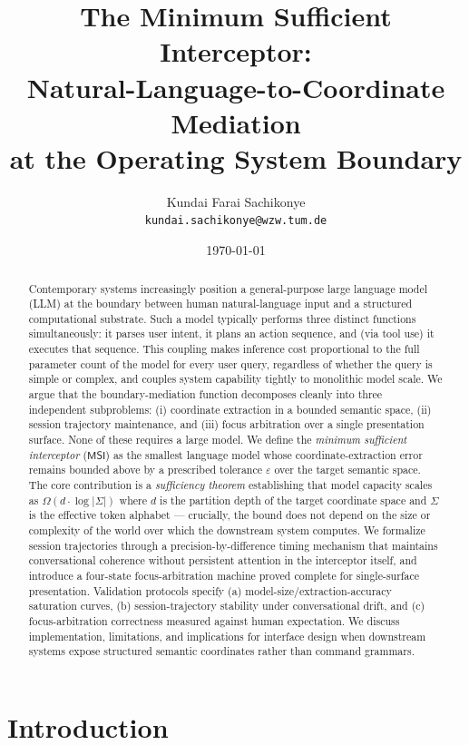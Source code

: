 \documentclass[11pt,a4paper]{article}
\title{The Minimum Sufficient Interceptor:\\
Natural-Language-to-Coordinate Mediation\\
at the Operating System Boundary}
\author{Kundai Farai Sachikonye\\
\texttt{kundai.sachikonye@wzw.tum.de}}
\date{\today}
\theoremstyle{definition}
\theoremstyle{remark}
\newcommand{\MSI}{\mathsf{MSI}}
\begin{document}
\maketitle

\begin{abstract}
Contemporary systems increasingly position a general-purpose large language model (LLM) at the boundary between human natural-language input and a structured computational substrate. Such a model typically performs three distinct functions simultaneously: it parses user intent, it plans an action sequence, and (via tool use) it executes that sequence. This coupling makes inference cost proportional to the full parameter count of the model for every user query, regardless of whether the query is simple or complex, and couples system capability tightly to monolithic model scale. We argue that the boundary-mediation function decomposes cleanly into three independent subproblems: (i) coordinate extraction in a bounded semantic space, (ii) session trajectory maintenance, and (iii) focus arbitration over a single presentation surface. None of these requires a large model. We define the \emph{minimum sufficient interceptor} ($\MSI$) as the smallest language model whose coordinate-extraction error remains bounded above by a prescribed tolerance $\varepsilon$ over the target semantic space. The core contribution is a \emph{sufficiency theorem} establishing that model capacity scales as $\Omega(d \cdot \log |\Sigma|)$ where $d$ is the partition depth of the target coordinate space and $\Sigma$ is the effective token alphabet --- crucially, the bound does not depend on the size or complexity of the world over which the downstream system computes. We formalize session trajectories through a precision-by-difference timing mechanism that maintains conversational coherence without persistent attention in the interceptor itself, and introduce a four-state focus-arbitration machine proved complete for single-surface presentation. Validation protocols specify (a) model-size/extraction-accuracy saturation curves, (b) session-trajectory stability under conversational drift, and (c) focus-arbitration correctness measured against human expectation. We discuss implementation, limitations, and implications for interface design when downstream systems expose structured semantic coordinates rather than command grammars.
\end{abstract}

\section{Introduction}
\label{sec:intro}
\end{document}
